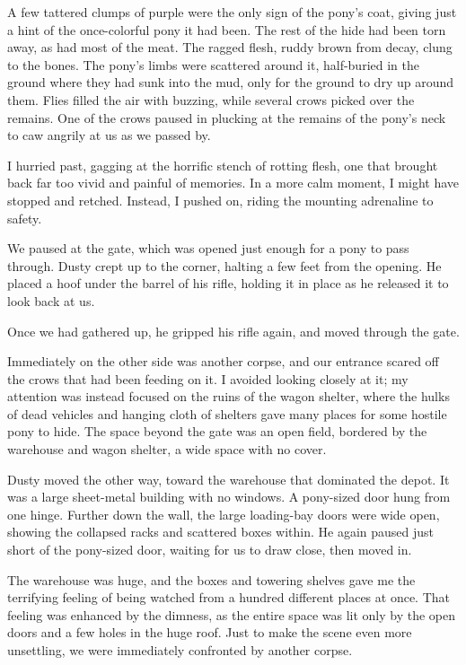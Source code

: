 A few tattered clumps of purple were the only sign of the pony’s coat, giving just a hint of the once-colorful pony it had been. The rest of the hide had been torn away, as had most of the meat. The ragged flesh, ruddy brown from decay, clung to the bones. The pony’s limbs were scattered around it, half-buried in the ground where they had sunk into the mud, only for the ground to dry up around them. Flies filled the air with buzzing, while several crows picked over the remains. One of the crows paused in plucking at the remains of the pony’s neck to caw angrily at us as we passed by.

I hurried past, gagging at the horrific stench of rotting flesh, one that brought back far too vivid and painful of memories. In a more calm moment, I might have stopped and retched. Instead, I pushed on, riding the mounting adrenaline to safety.

We paused at the gate, which was opened just enough for a pony to pass through. Dusty crept up to the corner, halting a few feet from the opening. He placed a hoof under the barrel of his rifle, holding it in place as he released it to look back at us.

Once we had gathered up, he gripped his rifle again, and moved through the gate.

Immediately on the other side was another corpse, and our entrance scared off the crows that had been feeding on it. I avoided looking closely at it; my attention was instead focused on the ruins of the wagon shelter, where the hulks of dead vehicles and hanging cloth of shelters gave many places for some hostile pony to hide. The space beyond the gate was an open field, bordered by the warehouse and wagon shelter, a wide space with no cover.

Dusty moved the other way, toward the warehouse that dominated the depot. It was a large sheet-metal building with no windows. A pony-sized door hung from one hinge. Further down the wall, the large loading-bay doors were wide open, showing the collapsed racks and scattered boxes within. He again paused just short of the pony-sized door, waiting for us to draw close, then moved in.

The warehouse was huge, and the boxes and towering shelves gave me the terrifying feeling of being watched from a hundred different places at once. That feeling was enhanced by the dimness, as the entire space was lit only by the open doors and a few holes in the huge roof. Just to make the scene even more unsettling, we were immediately confronted by another corpse.

